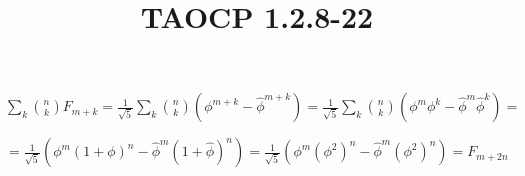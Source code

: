 \documentclass{article}
\title{TAOCP 1.2.8\mbox{-}22}
\begin{document}
\maketitle

\( \sum_{k} \binom{n}{k}F_{m+k} = \frac{1}{\sqrt{5}}\sum_{k} \binom{n}{k}(\phi^{m+k} - \hat\phi^{m+k}) = \frac{1}{\sqrt{5}} \sum_{k}\binom{n}{k}(\phi^{m}\phi^{k} - \hat\phi^{m}\hat{\phi}^{k}) = \)

\( =\frac{1}{\sqrt{5}}(\phi^{m}{(1+\phi)}^{n}-\hat\phi^{m}{(1+\hat\phi)}^{n}) = \frac{1}{\sqrt{5}}(\phi^{m}{(\phi^{2})}^{n}-\hat\phi^{m}{(\phi^{2})}^{n}) = F_{m+2n} \)
\end{document}
